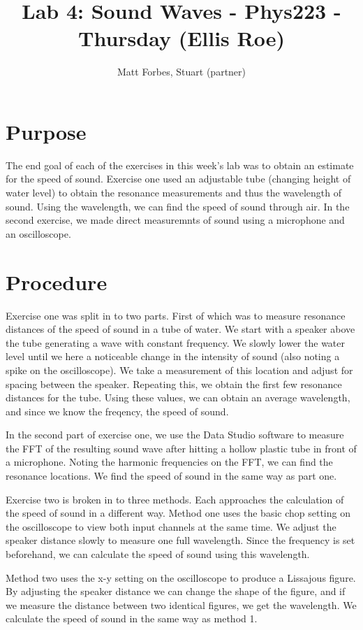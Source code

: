 \documentclass[12pt]{article}
\def \TITLE {Lab 4: Sound Waves - Phys223 - Thursday (Ellis Roe)}
\begin{document}
\onecolumn
\title{\TITLE}
\author{Matt Forbes, Stuart (partner)}
\maketitle

\twocolumn
\section*{Purpose}
The end goal of each of the exercises in this week's lab was to obtain
an estimate for the speed of sound. Exercise one used an adjustable
tube (changing height of water level) to obtain the resonance
measurements and thus the wavelength of sound. Using the wavelength,
we can find the speed of sound through air. In the second exercise, we
made direct measuremnts of sound using a microphone and an
oscilloscope.

\section*{Procedure}
Exercise one was split in to two parts. First of which was to measure
resonance distances of the speed of sound in a tube of water. We start
with a speaker above the tube generating a wave with constant
frequency. We slowly lower the water level until we here a noticeable
change in the intensity of sound (also noting a spike on the
oscilloscope). We take a measurement of this location and adjust for
spacing between the speaker. Repeating this, we obtain the first few
resonance distances for the tube. Using these values, we can obtain an
average wavelength, and since we know the freqency, the speed of
sound.

In the second part of exercise one, we use the Data Studio software to
measure the FFT of the resulting sound wave after hitting a hollow
plastic tube in front of a microphone. Noting the harmonic frequencies
on the FFT, we can find the resonance locations. We find the speed of
sound in the same way as part one.

Exercise two is broken in to three methods. Each approaches the
calculation of the speed of sound in a different way. Method one uses
the basic chop setting on the oscilloscope to view both input channels
at the same time. We adjust the speaker distance slowly to measure one
full wavelength. Since the frequency is set beforehand, we can
calculate the speed of sound using this wavelength.

Method two uses the x-y setting on the oscilloscope to produce a
Lissajous figure. By adjusting the speaker distance we can change the
shape of the figure, and if we measure the distance between two
identical figures, we get the wavelength. We calculate the speed of
sound in the same way as method 1.
\end{document}
